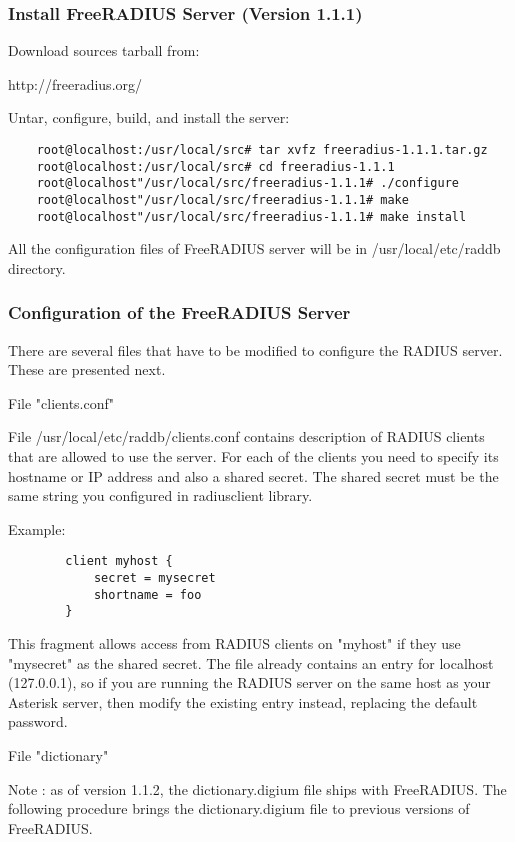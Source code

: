 \subsubsection{Install FreeRADIUS Server (Version 1.1.1)}
 
	Download sources tarball from:

		http://freeradius.org/

	Untar, configure, build, and install the server:

\begin{verbatim}
	root@localhost:/usr/local/src# tar xvfz freeradius-1.1.1.tar.gz
	root@localhost:/usr/local/src# cd freeradius-1.1.1
	root@localhost"/usr/local/src/freeradius-1.1.1# ./configure
	root@localhost"/usr/local/src/freeradius-1.1.1# make
	root@localhost"/usr/local/src/freeradius-1.1.1# make install
\end{verbatim}

	All the configuration files of FreeRADIUS server will be in 
	/usr/local/etc/raddb directory. 


\subsubsection{Configuration of the FreeRADIUS Server}

	There are several files that have to be modified to configure the
	RADIUS server. These are presented next.

	File "clients.conf"

	File /usr/local/etc/raddb/clients.conf contains description of 
	RADIUS clients that are allowed to use the server. For each of the 
	clients you need to specify its hostname or IP address and also a 
	shared secret. The shared secret must be the same string you configured
	in radiusclient library.

	Example:
\begin{verbatim}
		client myhost {
		    secret = mysecret
		    shortname = foo
		}
\end{verbatim}	

	This fragment allows access from RADIUS clients on "myhost" if they use 
	"mysecret" as the shared secret.	 
	The file already contains an entry for localhost (127.0.0.1), so if you
	are running the RADIUS server on the same host as your Asterisk server,
	then modify the existing entry instead, replacing the default password.

	File "dictionary"

	Note : as of version 1.1.2, the dictionary.digium file ships with FreeRADIUS. 
	The following procedure brings the dictionary.digium file to previous versions 
	of FreeRADIUS.

